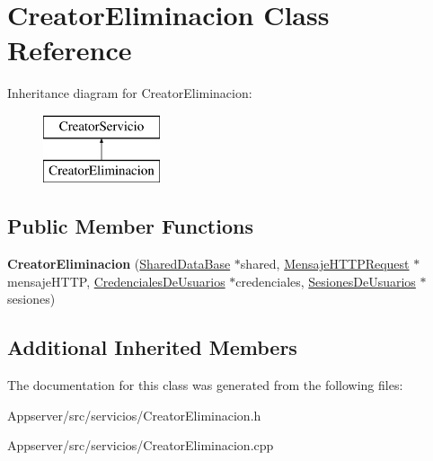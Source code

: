 \hypertarget{classCreatorEliminacion}{}\section{Creator\+Eliminacion Class Reference}
\label{classCreatorEliminacion}
Inheritance diagram for Creator\+Eliminacion\+:\begin{figure}[H]
\begin{center}
\leavevmode
\includegraphics[height=2.000000cm]{classCreatorEliminacion}
\end{center}
\end{figure}
\subsection*{Public Member Functions}
\begin{DoxyCompactItemize}
\item 
{\bfseries Creator\+Eliminacion} (\hyperlink{classSharedDataBase}{Shared\+Data\+Base} $\ast$shared, \hyperlink{classMensajeHTTPRequest}{Mensaje\+H\+T\+T\+P\+Request} $\ast$mensaje\+H\+T\+TP, \hyperlink{classCredencialesDeUsuarios}{Credenciales\+De\+Usuarios} $\ast$credenciales, \hyperlink{classSesionesDeUsuarios}{Sesiones\+De\+Usuarios} $\ast$sesiones)\hypertarget{classCreatorEliminacion_a9df93cdf1d8c07c9a26fd0647fffdfa6}{}\label{classCreatorEliminacion_a9df93cdf1d8c07c9a26fd0647fffdfa6}

\end{DoxyCompactItemize}
\subsection*{Additional Inherited Members}


The documentation for this class was generated from the following files\+:\begin{DoxyCompactItemize}
\item 
Appserver/src/servicios/Creator\+Eliminacion.\+h\item 
Appserver/src/servicios/Creator\+Eliminacion.\+cpp\end{DoxyCompactItemize}
